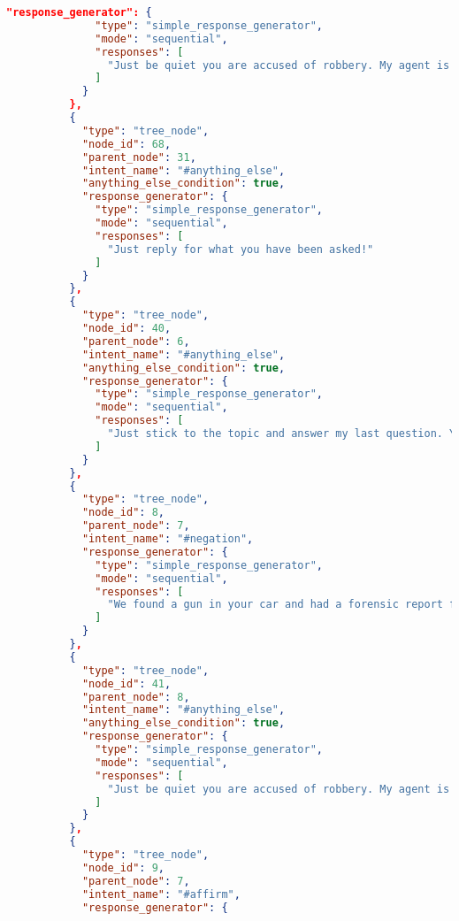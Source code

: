 \begin{appendix}
\begin{lstlisting}[language=json, firstnumber=1]
            "response_generator": {
              "type": "simple_response_generator",
              "mode": "sequential",
              "responses": [
                "Just be quiet you are accused of robbery. My agent is on his way to take you with him."
              ]
            }
          },
          {
            "type": "tree_node",
            "node_id": 68,
            "parent_node": 31,
            "intent_name": "#anything_else",
            "anything_else_condition": true,
            "response_generator": {
              "type": "simple_response_generator",
              "mode": "sequential",
              "responses": [
                "Just reply for what you have been asked!"
              ]
            }
          },
          {
            "type": "tree_node",
            "node_id": 40,
            "parent_node": 6,
            "intent_name": "#anything_else",
            "anything_else_condition": true,
            "response_generator": {
              "type": "simple_response_generator",
              "mode": "sequential",
              "responses": [
                "Just stick to the topic and answer my last question. You don't have any other option."
              ]
            }
          },
          {
            "type": "tree_node",
            "node_id": 8,
            "parent_node": 7,
            "intent_name": "#negation",
            "response_generator": {
              "type": "simple_response_generator",
              "mode": "sequential",
              "responses": [
                "We found a gun in your car and had a forensic report for it. And your fingerprints on that gun matches the one on the cash register. So you are being arrested for a robbery. You have a right to remain silent. Anything you say now will be used against you in the court of law. Hope you will enjoy your imprisonment. Hope to not see you again!"
              ]
            }
          },
          {
            "type": "tree_node",
            "node_id": 41,
            "parent_node": 8,
            "intent_name": "#anything_else",
            "anything_else_condition": true,
            "response_generator": {
              "type": "simple_response_generator",
              "mode": "sequential",
              "responses": [
                "Just be quiet you are accused of robbery. My agent is on his way to take you with him."
              ]
            }
          },
          {
            "type": "tree_node",
            "node_id": 9,
            "parent_node": 7,
            "intent_name": "#affirm",
            "response_generator": {

\end{lstlisting}
\end{appendix}
